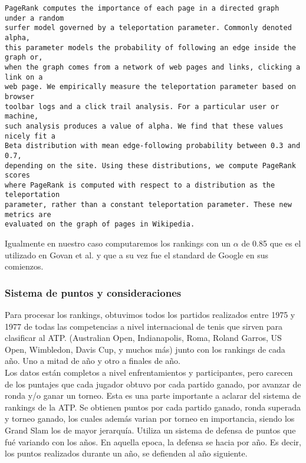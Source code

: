 \begin{verbatim}
PageRank computes the importance of each page in a directed graph under a random
surfer model governed by a teleportation parameter. Commonly denoted alpha, 
this parameter models the probability of following an edge inside the graph or, 
when the graph comes from a network of web pages and links, clicking a link on a 
web page. We empirically measure the teleportation parameter based on browser 
toolbar logs and a click trail analysis. For a particular user or machine, 
such analysis produces a value of alpha. We find that these values nicely fit a 
Beta distribution with mean edge-following probability between 0.3 and 0.7, 
depending on the site. Using these distributions, we compute PageRank scores 
where PageRank is computed with respect to a distribution as the teleportation 
parameter, rather than a constant teleportation parameter. These new metrics are 
evaluated on the graph of pages in Wikipedia.
\end{verbatim}

Igualmente en nuestro caso computaremos los rankings con un $\alpha$ de 0.85 que es el utilizado en Govan et al. y que a su vez fue el standard de Google en sus comienzos.	 

\subsubsection{Sistema de puntos y consideraciones}

Para procesar los rankings, obtuvimos todos los partidos realizados entre 1975 y 1977 de todas las competencias a nivel internacional de tenis que sirven para clasificar al ATP. (Australian Open, Indianapolis, Roma, Roland Garros, US Open, Wimbledon, Davis Cup, y muchos más) junto con los rankings de cada año. Uno a mitad de año y otro a finales de año. 
\\
Los datos están completos a nivel enfrentamientos y participantes, pero carecen de los puntajes que cada jugador obtuvo por cada partido ganado, por avanzar de ronda y/o ganar un torneo.
Esta es una parte importante a aclarar del sistema de rankings de la ATP. Se obtienen puntos por cada partido ganado, ronda superada y torneo ganado, los cuales además varian por torneo en importancia, siendo los Grand Slam los de mayor jerarquía. 
Utiliza un sistema de defensa de puntos que fué variando con los años. En aquella epoca, la defensa se hacia por año. Es decir, los puntos realizados durante un año, se defienden al año siguiente. 


